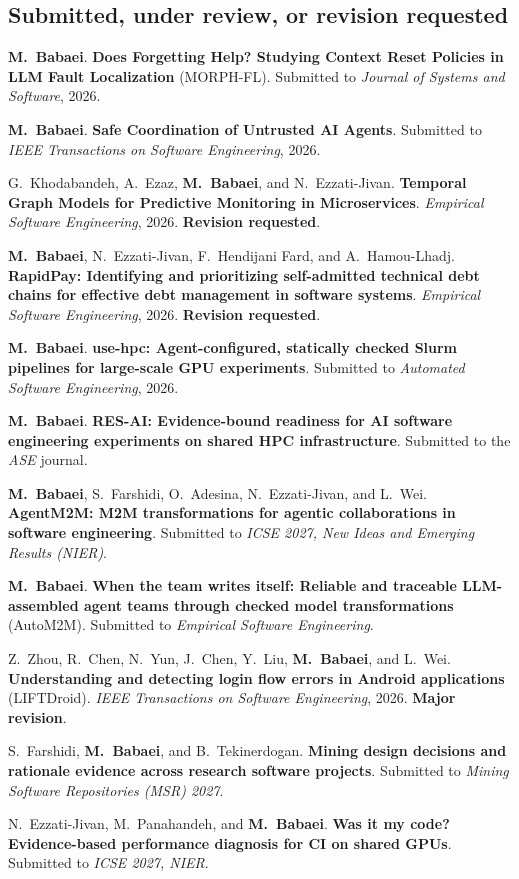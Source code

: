 \documentclass[10pt,letterpaper]{article}
\newcommand{\me}{\textbf{M.~Babaei}}
\begin{document}
\subsection{Submitted, under review, or revision requested}
\begin{enumerate}[label={[S\arabic*]}]
\item \me. \textbf{Does Forgetting Help? Studying Context Reset Policies in LLM Fault Localization} (MORPH-FL). Submitted to \emph{Journal of Systems and Software}, 2026.
\item \me. \textbf{Safe Coordination of Untrusted AI Agents}. Submitted to \emph{IEEE Transactions on Software Engineering}, 2026.
\item G.\ Khodabandeh, A.\ Ezaz, \me, and N.\ Ezzati-Jivan. \textbf{Temporal Graph Models for Predictive Monitoring in Microservices}. \emph{Empirical Software Engineering}, 2026. \textbf{Revision requested}.
\item \me, N.\ Ezzati-Jivan, F.\ Hendijani Fard, and A.\ Hamou-Lhadj. \textbf{RapidPay: Identifying and prioritizing self-admitted technical debt chains for effective debt management in software systems}. \emph{Empirical Software Engineering}, 2026. \textbf{Revision requested}.
\item \me. \textbf{use-hpc: Agent-configured, statically checked Slurm pipelines for large-scale GPU experiments}. Submitted to \emph{Automated Software Engineering}, 2026.
\item \me. \textbf{RES-AI: Evidence-bound readiness for AI software engineering experiments on shared HPC infrastructure}. Submitted to the \emph{ASE} journal.
\item \me, S.\ Farshidi, O.\ Adesina, N.\ Ezzati-Jivan, and L.\ Wei. \textbf{AgentM2M: M2M transformations for agentic collaborations in software engineering}. Submitted to \emph{ICSE 2027, New Ideas and Emerging Results (NIER)}.
\item \me. \textbf{When the team writes itself: Reliable and traceable LLM-assembled agent teams through checked model transformations} (AutoM2M). Submitted to \emph{Empirical Software Engineering}.
\item Z.\ Zhou, R.\ Chen, N.\ Yun, J.\ Chen, Y.\ Liu, \me, and L.\ Wei. \textbf{Understanding and detecting login flow errors in Android applications} (LIFTDroid). \emph{IEEE Transactions on Software Engineering}, 2026. \textbf{Major revision}.
\item S.\ Farshidi, \me, and B.\ Tekinerdogan. \textbf{Mining design decisions and rationale evidence across research software projects}. Submitted to \emph{Mining Software Repositories (MSR) 2027}.
\item N.\ Ezzati-Jivan, M.\ Panahandeh, and \me. \textbf{Was it my code? Evidence-based performance diagnosis for CI on shared GPUs}. Submitted to \emph{ICSE 2027, NIER}.
\end{enumerate}
\end{document}
